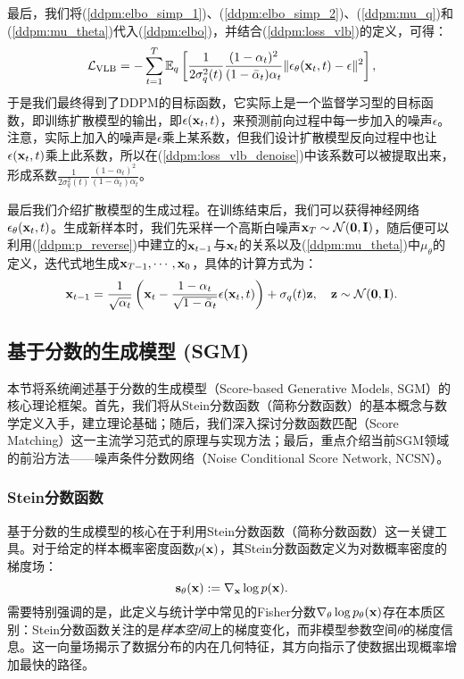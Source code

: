 \documentclass[11pt,a4paper,UTF8]{ctexart}
\begin{document}
最后，我们将(\ref{ddpm:elbo_simp_1})、(\ref{ddpm:elbo_simp_2})、(\ref{ddpm:mu_q})和(\ref{ddpm:mu_theta})代入(\ref{ddpm:elbo})，并结合(\ref{ddpm:loss_vlb})的定义，可得：
\begin{equation}
\mathcal{L}_{\text{VLB}} = -\sum_{t=1}^T \mathbb{E}_q \left[\frac{1}{2\sigma_q^2(t)}\frac{(1-\alpha_t)^2}{(1-\bar{\alpha}_t)\alpha_t}\|\epsilon_{\theta}(\mathbf{x}_t,t)-\epsilon \|^2 \right],
\label{ddpm:loss_vlb_denoise}
\end{equation}
于是我们最终得到了DDPM的目标函数，它实际上是一个监督学习型的目标函数，即训练扩散模型的输出，即$\epsilon(\mathbf{x}_t,t)$，来预测前向过程中每一步加入的噪声$\epsilon$。注意，实际上加入的噪声是$\epsilon$乘上某系数，但我们设计扩散模型反向过程中也让$\epsilon(\mathbf{x}_t,t)$乘上此系数，所以在(\ref{ddpm:loss_vlb_denoise})中该系数可以被提取出来，形成系数$\frac{1}{2\sigma_q^2(t)}\frac{(1-\alpha_t)^2}{(1-\bar{\alpha}_t)\alpha_t}$。

最后我们介绍扩散模型的生成过程。在训练结束后，我们可以获得神经网络$\epsilon_{\theta}(\mathbf{x}_t,t)$。生成新样本时，我们先采样一个高斯白噪声$\mathbf{x}_T\sim\mathcal{N}(\mathbf{0},\mathbf{I})$，随后便可以利用(\ref{ddpm:p_reverse})中建立的$\mathbf{x}_{t-1}$与$\mathbf{x}_t$的关系以及(\ref{ddpm:mu_theta})中$\mu_\theta$的定义，迭代式地生成$\mathbf{x}_{T-1},\cdots,\mathbf{x}_0$，具体的计算方式为：
\begin{equation*}
    \mathbf{x}_{t-1} = \frac{1}{\sqrt{\alpha_t}}\left(\mathbf{x}_t -\frac{1-\alpha_t}{\sqrt{1-\bar{\alpha}_t}} \epsilon(\mathbf{x}_t,t) \right) + \sigma_q(t)\mathbf{z},\quad \mathbf{z}\sim\mathcal{N}(\mathbf{0},\mathbf{I}).
\end{equation*}


\subsection{基于分数的生成模型 (SGM)}

本节将系统阐述基于分数的生成模型（Score-based Generative Models, SGM）的核心理论框架。首先，我们将从Stein分数函数（简称分数函数）的基本概念与数学定义入手，建立理论基础；随后，我们深入探讨分数函数匹配（Score Matching）这一主流学习范式的原理与实现方法；最后，重点介绍当前SGM领域的前沿方法——噪声条件分数网络（Noise Conditional Score Network, NCSN）。

\subsubsection{Stein分数函数}

基于分数的生成模型的核心在于利用Stein分数函数（简称分数函数）\cite{Hyvrinen2005EstimationON}这一关键工具。对于给定的样本概率密度函数$p(\mathbf{x})$，其Stein分数函数定义为对数概率密度的梯度场：
\begin{equation*}
    \mathbf{s}_\theta(\mathbf{x}) := \nabla_{\mathbf{x}}\log p(\mathbf{x}).
\end{equation*}
需要特别强调的是，此定义与统计学中常见的Fisher分数$\nabla_\theta \log p_{\theta}(\mathbf{x})$存在本质区别：Stein分数函数关注的是\emph{样本空间}上的梯度变化，而非模型参数空间$\theta$的梯度信息。这一向量场揭示了数据分布的内在几何特征，其方向指示了使数据出现概率增加最快的路径。
\end{document}
